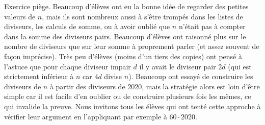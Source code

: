 Exercice piège. Beaucoup d'élèves ont eu la bonne idée de regarder des petites valeurs de $n$, mais ils sont nombreux aussi à s'être trompés dans les listes de diviseurs, les calculs de somme, ou à avoir oublié que $n$ n'était pas à compter dans la somme des diviseurs pairs. Beaucoup d'élèves ont raisonné plus sur le nombre de diviseurs que sur leur somme à proprement parler (et assez souvent de façon imprécise). Très peu d'élèves (moins d'un tiers des copies) ont pensé à l'astuce que pour chaque diviseur impair $d$ il y avait le diviseur pair $2d$ (qui est strictement inférieur à $n$ car $4d$ divise $n$). Beaucoup ont essayé de construire les diviseurs de $n$ à partir des diviseurs de $2020$, mais la stratégie alors est loin d'être simple car il est facile d'en oublier ou de construire plusieurs fois les mêmes, ce qui invalide la preuve. Nous invitons tous les élèves qui ont tenté cette approche à vérifier leur argument en l'appliquant par exemple à $60 \cdot 2020$.